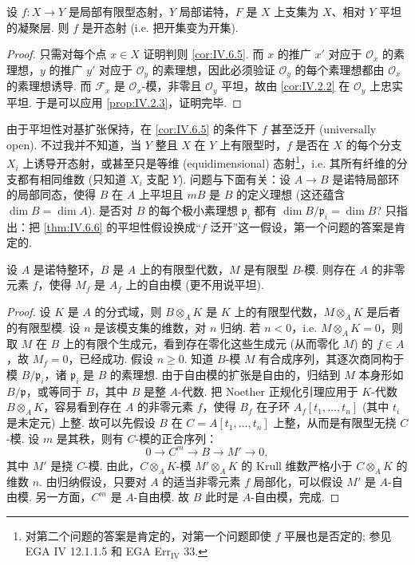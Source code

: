 \begin{theorem}\label{thm:IV.6.6}
设 $f \colon X \to Y$ 是局部有限型态射，$Y$ 局部诺特，$F$ 是 $X$ 上支集为 $X$、相对 $Y$ 平坦的凝聚层. 则 $f$ 是开态射 (i.e. 把开集变为开集).
\end{theorem}

\begin{proof}
只需对每个点 $x \in X$ 证明判则 \ref{cor:IV.6.5}. 而 $x$ 的推广 $x'$ 对应于 $\mathcal{O}_x$ 的素理想，$y$ 的推广 $y'$ 对应于 $\mathcal{O}_y$ 的素理想，因此必须验证 $\mathcal{O}_y$ 的每个素理想都由 $\mathcal{O}_x$ 的素理想诱导. 而 $\mathcal{F}_x$ 是 $\mathcal{O}_x$-模，非零且 $\mathcal{O}_y$ 平坦，故由 \ref{cor:IV.2.2} 在 $\mathcal{O}_y$ 上忠实平坦. 于是可以应用 \ref{prop:IV.2.3}，证明完毕.
\end{proof}

\begin{remarkstar}
由于平坦性对基扩张保持，在 \ref{cor:IV.6.5} 的条件下 $f$ 甚至泛开 (universally open). 不过我并不知道，当 $Y$ 整且 $X$ 在 $Y$ 上有限型时，$f$ 是否在 $X$ 的每个分支 $X_i$ 上诱导开态射，或甚至只是等维 (equidimensional) 态射\footnote{对第二个问题的答案是肯定的，对第一个问题即使 $f$ 平展也是否定的; 参见 EGA IV 12.1.1.5 和 EGA Err$_{\mathrm{IV}}$ 33.}，i.e. 其所有纤维的分支都有相同维数 (只知道 $X_i$ 支配 $Y$). 问题与下面有关：设 $A \to B$ 是诺特局部环的局部同态，使得 $B$ 在 $A$ 上平坦且 $mB$ 是 $B$ 的定义理想 (这还蕴含 $\dim B = \dim A$). 是否对 $B$ 的每个极小素理想 $\mathfrak{p}_i$ 都有 $\dim B/\mathfrak{p}_i = \dim B$? 只指出：把 \ref{thm:IV.6.6} 的平坦性假设换成``$f$ 泛开''这一假设，第一个问题的答案是肯定的.
\end{remarkstar}

\begin{lemma}\label{lem:IV.6.7}
设 $A$ 是诺特整环，$B$ 是 $A$ 上的有限型代数，$M$ 是有限型 $B$-模. 则存在 $A$ 的非零元素 $f$，使得 $M_f$ 是 $A_f$ 上的自由模 (更不用说平坦).
\end{lemma}

\begin{proof}
设 $K$ 是 $A$ 的分式域，则 $B \otimes_A K$ 是 $K$ 上的有限型代数，$M \otimes_A K$ 是后者的有限型模. 设 $n$ 是该模支集的维数，对 $n$ 归纳. 若 $n < 0$，i.e. $M \otimes_A K = 0$，则取 $M$ 在 $B$ 上的有限个生成元，看到存在零化这些生成元 (从而零化 $M$) 的 $f \in A$，故 $M_f = 0$，已经成功. 假设 $n \geqslant 0$. 知道 $B$-模 $M$ 有合成序列，其逐次商同构于模 $B/\mathfrak{p}_i$，诸 $\mathfrak{p}_i$ 是 $B$ 的素理想. 由于自由模的扩张是自由的，归结到 $M$ 本身形如 $B/\mathfrak{p}$，或等同于 $B$，其中 $B$ 是整 $A$-代数. 把 Noether 正规化引理应用于 $K$-代数 $B \otimes_A K$，容易看到存在 $A$ 的非零元素 $f$，使得 $B_f$ 在子环 $A_f[t_1, \dots, t_n]$ (其中 $t_i$ 是未定元) 上整. 故可以先假设 $B$ 在 $C = A[t_1, \dots, t_n]$ 上整，从而是有限型无挠 $C$-模. 设 $m$ 是其秩，则有 $C$-模的正合序列：
\[
0 \longrightarrow C^m \longrightarrow B \longrightarrow M' \longrightarrow 0,
\]
其中 $M'$ 是挠 $C$-模. 由此，$C \otimes_A K$-模 $M' \otimes_A K$ 的 Krull 维数严格小于 $C \otimes_A K$ 的维数 $n$. 由归纳假设，只要对 $A$ 的适当非零元素 $f$ 局部化，可以假设 $M'$ 是 $A$-自由模. 另一方面，$C^m$ 是 $A$-自由模. 故 $B$ 此时是 $A$-自由模，完成.
\end{proof}

